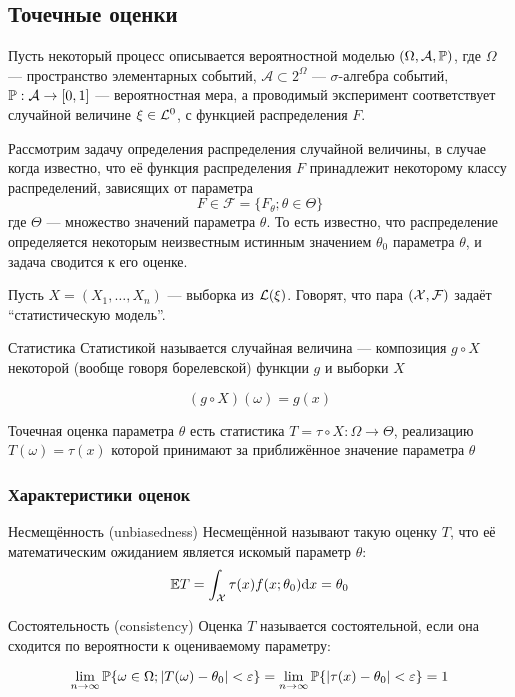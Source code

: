 \subsection{Точечные оценки}

Пусть некоторый процесс
описывается вероятностной моделью $(\Omega, \mathcal A, \mathbb P)$,
где $\Omega$ --- пространство элементарных событий,
$\mathcal A \subset 2^\Omega$ --- $\sigma$-алгебра событий,
${\mathbb P: \mathcal A\to \left[{0, 1}\right]}$ --- вероятностная мера,
а проводимый эксперимент соответствует случайной величине $\xi\in\mathcal L^{0}$,
с функцией распределения $F$.

Рассмотрим задачу определения распределения случайной величины,
в случае когда известно,
что её функция распределения $F$
принадлежит некоторому классу распределений,
зависящих от параметра
$$F\in\mathcal F = \{F_\theta; \theta\in\Theta\}$$
где $\Theta$ --- множество значений параметра $\theta$.
То есть известно,
что распределение определяется некоторым неизвестным истинным значением $\theta_0$ параметра $\theta$,
и задача сводится к его оценке.

Пусть $X = (X_1, \dotsc, X_n)$ --- выборка из $\mathcal L(\xi)$.
Говорят, что пара $(\mathcal X, \mathcal F)$ задаёт ``статистическую модель''.

\begin{dfn}{Статистика}
Статистикой называется случайная величина
--- композиция $g\circ X$ некоторой
(вообще говоря борелевской) функции $g$ и выборки $X$

$$(g\circ X)(\omega) = g(x)$$
\end{dfn}

\begin{dfn}{Точечная оценка параметра $\theta$}
есть статистика ${T = \tau\circ X: \Omega\to\Theta}$,
реализацию $T(\omega) = \tau(x)$ которой принимают за приближённое значение параметра $\theta$
\end{dfn}

\subsubsection{Характеристики оценок}

\begin{dfn}{Несмещённость (unbiasedness)}
Несмещённой называют такую оценку $T$,
что её математическим ожиданием является искомый параметр $\theta$:
$$\mathbb E T = \int_\mathcal X \tau(x) f(x;\theta_0) \mathrm d x = \theta_0$$
\end{dfn}

\begin{dfn}{Состоятельность (consistency)}
Оценка $T$ называется состоятельной,
если она сходится по вероятности к оцениваемому параметру:

$$\lim_{n\to\infty}
    \mathbb P\{\omega\in\Omega; \left|T(\omega) - \theta_0\right| < \varepsilon \}
= \lim_{n\to\infty}
    \mathbb P\{\left|\tau(x) - \theta_0\right| < \varepsilon\}
= 1$$
\end{dfn}

